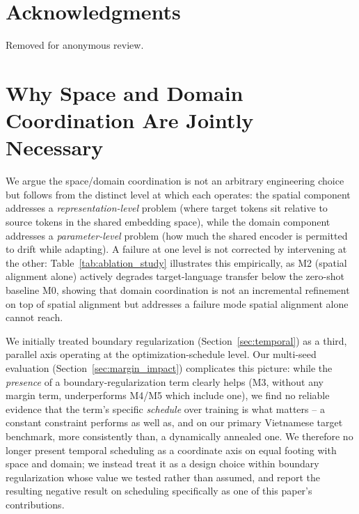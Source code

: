 \documentclass[11pt]{article}
\begin{document}
\section*{Acknowledgments}
Removed for anonymous review.

%



\appendix

\section{Why Space and Domain Coordination Are Jointly Necessary}
\label{sec:appendix_three_axes}
We argue the space/domain coordination is not an arbitrary engineering choice but follows from the distinct level at which each operates: the spatial component addresses a \emph{representation-level} problem (where target tokens sit relative to source tokens in the shared embedding space), while the domain component addresses a \emph{parameter-level} problem (how much the shared encoder is permitted to drift while adapting). A failure at one level is not corrected by intervening at the other: Table~\ref{tab:ablation_study} illustrates this empirically, as M2 (spatial alignment alone) actively degrades target-language transfer below the zero-shot baseline M0, showing that domain coordination is not an incremental refinement on top of spatial alignment but addresses a failure mode spatial alignment alone cannot reach.

We initially treated boundary regularization (Section~\ref{sec:temporal}) as a third, parallel axis operating at the optimization-schedule level. Our multi-seed evaluation (Section~\ref{sec:margin_impact}) complicates this picture: while the \emph{presence} of a boundary-regularization term clearly helps (M3, without any margin term, underperforms M4/M5 which include one), we find no reliable evidence that the term's specific \emph{schedule} over training is what matters -- a constant constraint performs as well as, and on our primary Vietnamese target benchmark, more consistently than, a dynamically annealed one. We therefore no longer present temporal scheduling as a coordinate axis on equal footing with space and domain; we instead treat it as a design choice within boundary regularization whose value we tested rather than assumed, and report the resulting negative result on scheduling specifically as one of this paper's contributions.
\end{document}
